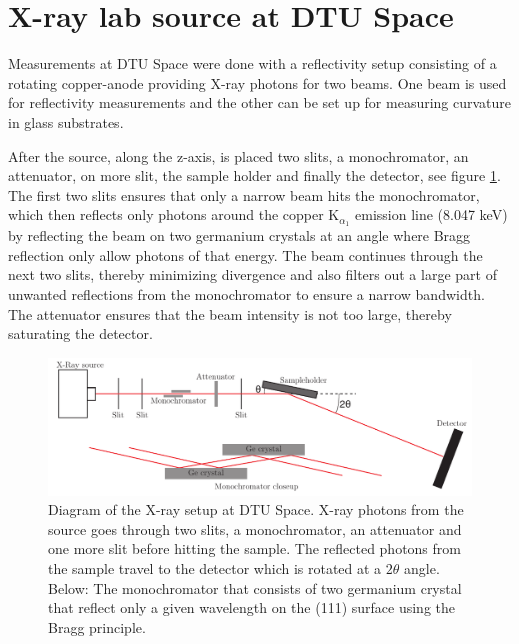 %

\section{X-ray lab source at DTU Space}\label{sec:xray-lab}
Measurements at DTU Space were done with a reflectivity setup consisting of a rotating copper-anode providing X-ray photons for two beams. One beam is used for reflectivity measurements and the other can be set up for measuring curvature in glass substrates.

After the source, along the z-axis, is placed two slits, a monochromator, an attenuator, on more slit, the sample holder and finally the detector, see figure \ref{fig:xraysetup}. The first two slits ensures that only a narrow beam hits the monochromator, which then reflects only photons around the copper K$_{\alpha_1}$ emission line (8.047 keV) by reflecting the beam on two germanium crystals at an angle where Bragg reflection only allow photons of that energy. The beam continues through the next two slits, thereby minimizing divergence and also filters out a large part of unwanted reflections from the monochromator to ensure a narrow bandwidth. The attenuator ensures that the beam intensity is not too large, thereby saturating the detector.

\begin{figure}[!h]
  \center
  \includegraphics[width=0.8\linewidth]{figures/chamber/xraysetup.pdf}
\caption{\footnotesize Diagram of the X-ray setup at DTU Space. X-ray photons from the source goes through two slits, a monochromator, an attenuator and one more slit before hitting the sample. The reflected photons from the sample travel to the detector which is rotated at a $2\theta$ angle. Below: The monochromator that consists of two germanium crystal that reflect only a given wavelength on the (111) surface using the Bragg principle.}\label{fig:xraysetup}
\end{figure}

